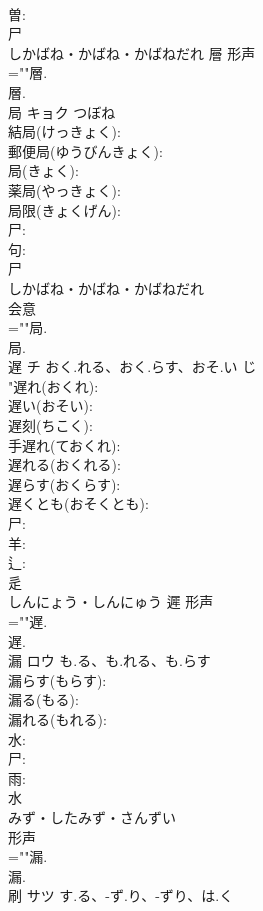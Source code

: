 \documentclass[8pt]{extreport}
\begin{document}
\begin{CJK}{UTF8}{min}
\\	曽: 
\\	尸	
\\	しかばね・かばね・かばねだれ	層	形声 
\\	=""層.
\\	層.
\\	局	キョク	つぼね		
\\	結局(けっきょく): 
\\	郵便局(ゆうびんきょく): 
\\	局(きょく): 
\\	薬局(やっきょく): 
\\	局限(きょくげん): 
\\	尸: 
\\	句: 
\\	尸	
\\	しかばね・かばね・かばねだれ	
\\	会意 
\\	=""局.
\\	局.
\\	遅	チ	おく.れる、おく.らす、おそ.い	じ	
\\	"遅れ(おくれ): 
\\	遅い(おそい): 
\\	遅刻(ちこく): 
\\	手遅れ(ておくれ): 
\\	遅れる(おくれる): 
\\	遅らす(おくらす): 
\\	遅くとも(おそくとも): 
\\	尸: 
\\	羊: 
\\	辶: 
\\	辵	
\\	しんにょう・しんにゅう	遲	形声 
\\	=""遅.
\\	遅.
\\	漏	ロウ	も.る、も.れる、も.らす		
\\	漏らす(もらす): 
\\	漏る(もる): 
\\	漏れる(もれる): 
\\	水: 
\\	尸: 
\\	雨: 
\\	水	
\\	みず・したみず・さんずい	
\\	形声 
\\	=""漏.
\\	漏.
\\	刷	サツ	す.る、-ず.り、-ずり、は.く		

\end{CJK}
\end{document}
